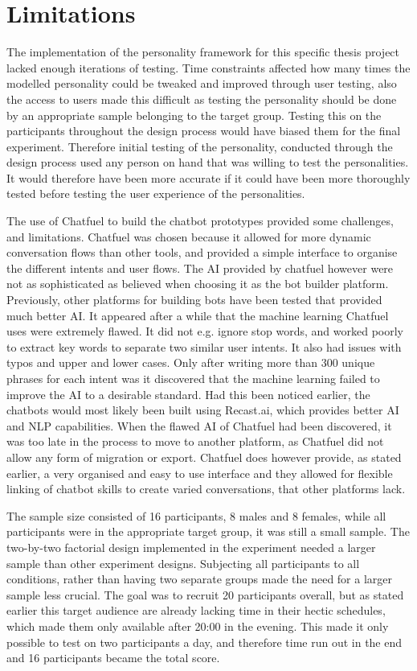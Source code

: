 \section{Limitations}

The implementation of the personality framework for this specific thesis project lacked enough iterations of testing. Time constraints affected how many times the modelled personality could be tweaked and improved through user testing, also the access to users made this difficult as testing the personality should be done by an appropriate sample belonging to the target group. Testing this on the participants throughout the design process would have biased them for the final experiment. Therefore initial testing of the personality, conducted through the design process used any person on hand that was willing to test the personalities. It would therefore have been more accurate if it could have been more thoroughly tested before testing the user experience of the personalities.

The use of Chatfuel to build the chatbot prototypes provided some challenges, and limitations. Chatfuel was chosen because it allowed for more dynamic conversation flows than other tools, and provided a simple interface to organise the different intents and user flows. The AI provided by chatfuel however were not as sophisticated as believed when choosing it as the bot builder platform. Previously, other platforms for building bots have been tested that provided much better AI. It appeared after a while that the machine learning Chatfuel uses were extremely flawed. It did not e.g. ignore stop words, and worked poorly to extract key words to separate two similar user intents. It also had issues with typos and upper and lower cases. Only after writing more than 300 unique phrases for each intent was it discovered that the machine learning failed to improve the AI to a desirable standard. Had this been noticed earlier, the chatbots would most likely been built using Recast.ai, which provides better AI and NLP capabilities. When the flawed AI of Chatfuel had been discovered, it was too late in the process to move to another platform, as Chatfuel did not allow any form of migration or export. Chatfuel does however provide, as stated earlier, a very organised and easy to use interface and they allowed for flexible linking of chatbot skills to create varied conversations, that other platforms lack. 

The sample size consisted of 16 participants, 8 males and 8 females, while all participants were in the appropriate target group, it was still a small sample. The two-by-two factorial design implemented in the experiment needed a larger sample than other experiment designs. Subjecting all participants to all conditions, rather than having two separate groups made the need for a larger sample less crucial. The goal was to recruit 20 participants overall, but as stated earlier this target audience are already lacking time in their hectic schedules, which made them only available after 20:00 in the evening. This made it only possible to test on two participants a day, and therefore time run out in the end and 16 participants became the total score.